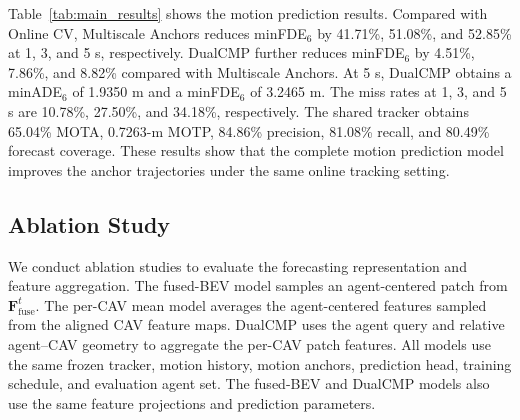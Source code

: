 \documentclass[lettersize,journal]{IEEEtran}
\begin{document}
\begin{table}[t]
\centering
\caption{Motion prediction results on the V2V4Real test set under the strict-online setting. ADE and FDE are measured in meters. All methods use the same online tracking results and evaluation agent set.}
\label{tab:main_results}
\end{table}

Table~\ref{tab:main_results} shows the motion prediction results. Compared with Online CV, Multiscale Anchors reduces minFDE$_6$ by 41.71\%, 51.08\%, and 52.85\% at 1, 3, and 5 s, respectively. DualCMP further reduces minFDE$_6$ by 4.51\%, 7.86\%, and 8.82\% compared with Multiscale Anchors. At 5 s, DualCMP obtains a minADE$_6$ of 1.9350 m and a minFDE$_6$ of 3.2465 m. The miss rates at 1, 3, and 5 s are 10.78\%, 27.50\%, and 34.18\%, respectively. The shared tracker obtains 65.04\% MOTA, 0.7263-m MOTP, 84.86\% precision, 81.08\% recall, and 80.49\% forecast coverage. These results show that the complete motion prediction model improves the anchor trajectories under the same online tracking setting.

\subsection{Ablation Study}

We conduct ablation studies to evaluate the forecasting representation and feature aggregation. The fused-BEV model samples an agent-centered patch from \(\mathbf{F}_{\mathrm{fuse}}^t\). The per-CAV mean model averages the agent-centered features sampled from the aligned CAV feature maps. DualCMP uses the agent query and relative agent--CAV geometry to aggregate the per-CAV patch features. All models use the same frozen tracker, motion history, motion anchors, prediction head, training schedule, and evaluation agent set. The fused-BEV and DualCMP models also use the same feature projections and prediction parameters.
\end{document}
